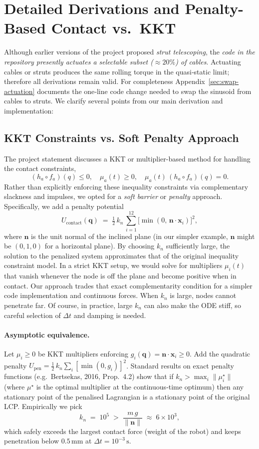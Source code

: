 \documentclass[12pt,letterpaper]{article}
\newcommand{\q}{\bm{q}}
\newcommand{\x}{\bm{x}}
\newcommand{\bfn}{\bm{n}}
\begin{document}
\section{Detailed Derivations and Penalty-Based Contact vs.\ KKT}
\label{sec:appendix-deriv}
Although earlier versions of the project proposed \emph{strut telescoping},
the \emph{code in the repository presently actuates a selectable subset
($\approx20\%$) of cables}.  Actuating cables or struts produces the same
rolling torque in the quasi‑static limit; therefore all derivations remain
valid.  For completeness Appendix~\ref{sec:swap-actuation} documents the
one‑line code change needed to swap the sinusoid from cables to struts. We clarify several points from our main derivation and implementation:

\subsection{KKT Constraints vs. Soft Penalty Approach}
The project statement discusses a KKT or multiplier-based method for handling the contact constraints,
\[
  (h_a \circ f_a)(q) \le 0,\quad \mu_a(t)\ge 0,\quad \mu_a(t)\,(h_a\circ f_a)(q)=0.
\]
Rather than explicitly enforcing these inequality constraints via complementary slackness and impulses, we opted for a \emph{soft barrier} or \emph{penalty} approach. Specifically, we add a penalty potential
\[
  U_{\mathrm{contact}}(\q) \;=\; \tfrac12\, k_{n}\,\sum_{i=1}^{12} \bigl[\min(0,\,\bfn \cdot \x_i)\bigr]^2,
\]
where $\bfn$ is the unit normal of the inclined plane (in our simpler example, $\bfn$ might be $(0,1,0)$ for a horizontal plane). By choosing $k_{n}$ sufficiently large, the solution to the penalized system approximates that of the original inequality constraint model. In a strict KKT setup, we would solve for multipliers $\mu_i(t)$ that vanish whenever the node is off the plane and become positive when in contact. Our approach trades that exact complementarity condition for a simpler code implementation and continuous forces. When $k_n$ is large, nodes cannot penetrate far. Of course, in practice, large $k_n$ can also make the ODE stiff, so careful selection of $\Delta t$ and damping is needed.

\paragraph{Asymptotic equivalence.}
Let $\mu_i\ge0$ be KKT multipliers enforcing $g_i(\q)=\bfn\!\cdot\!\x_i\ge0$.
Add the quadratic penalty $U_{\mathrm{pen}}=\frac12\,k_n\sum_i[\min(0,g_i)]^2$.
Standard results on exact penalty functions (e.g.\ Bertsekas, 2016, Prop.~4.2)
show that if $k_n > \max_i \|\mu_i^\star\|$ (where $\mu^\star$ is the optimal
multiplier at the continuous‑time optimum) then any stationary point of the
penalised Lagrangian is a stationary point of the original LCP.  Empirically we
pick
\[
  k_n \;=\; 10^5 \;>\;
  \frac{m\,g}{\|\bfn\|}\;\approx\;6\times10^3,
\]
which safely exceeds the largest contact force (weight of the robot) and keeps
penetration below $0.5\,\mathrm{mm}$ at $\Delta t=10^{-3}\,\mathrm{s}$.
\end{document}
